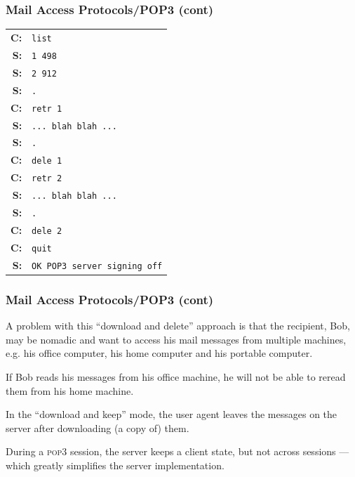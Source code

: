 %
\begin{frame}[containsverbatim]
\frametitle{Mail Access Protocols/POP3 (cont)}

{\small
\renewcommand\arraystretch{0.8}
\begin{tabular}{rl}
\textbf{C:} & \verb+list+\\
\textbf{S:} & \verb+1 498+\\
\textbf{S:} & \verb+2 912+\\
\textbf{S:} & \verb+.+\\
\textbf{C:} & \verb+retr 1+\\
\textbf{S:} & \verb+... blah blah ...+\\
\textbf{S:} & \verb+.+\\
\textbf{C:} & \verb+dele 1+\\
\textbf{C:} & \verb+retr 2+\\
\textbf{S:} & \verb+... blah blah ...+\\
\textbf{S:} & \verb+.+\\
\textbf{C:} & \verb+dele 2+\\
\textbf{C:} & \verb+quit+\\
\textbf{S:} & \verb+OK POP3 server signing off+
\end{tabular}
}

\end{frame}

%
\begin{frame}
\frametitle{Mail Access Protocols/POP3 (cont)}

A problem with this ``download and delete'' approach is that the
recipient, Bob, may be nomadic and want to access his mail messages
from multiple machines, e.g. his office computer, his home computer
and his portable computer.

If Bob reads his messages from his office machine, he will not be able
to reread them from his home machine.

In the ``download and keep'' mode, the user agent leaves the messages
on the server after downloading (a copy of) them.

During a \textsc{pop3} session, the server keeps a client state, but
not across sessions --- which greatly simplifies the server
implementation.

\end{frame}

